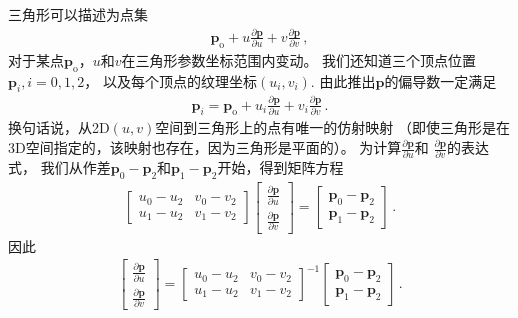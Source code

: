 三角形可以描述为点集
\begin{align*}
    \bm p_{\mathrm{o}}+u\frac{\partial \bm p}{\partial u}+v\frac{\partial \bm p}{\partial v}\, ,
\end{align*}
对于某点$\bm p_{\mathrm{o}}$，$u$和$v$在三角形参数坐标范围内变动。
我们还知道三个顶点位置$\bm p_i, i=0,1,2$，
以及每个顶点的纹理坐标$(u_i,v_i)$.
由此推出$\bm p$的偏导数一定满足
\begin{align*}
    \bm p_i=\bm p_{\mathrm{o}}+u_i\frac{\partial \bm p}{\partial u}+v_i\frac{\partial \bm p}{\partial v}\, .
\end{align*}
换句话说，从2D$(u,v)$空间到三角形上的点有唯一的仿射映射
（即使三角形是在3D空间指定的，该映射也存在，因为三角形是平面的）。
为计算$\displaystyle\frac{\partial \bm p}{\partial u}$和
$\displaystyle\frac{\partial \bm p}{\partial v}$的表达式，
我们从作差$\bm p_0-\bm p_2$和$\bm p_1-\bm p_2$开始，得到矩阵方程
\begin{align*}
    \left[\begin{array}{cc}
            u_0-u_2 & v_0-v_2 \\
            u_1-u_2 & v_1-v_2
        \end{array}\right]\left[\begin{array}{c}
            \displaystyle\frac{\partial \bm p}{\partial u} \\
            \displaystyle\frac{\partial \bm p}{\partial v}
        \end{array}\right]=\left[\begin{array}{c}
            \bm p_0-\bm p_2 \\
            \bm p_1-\bm p_2
        \end{array}\right]\, .
\end{align*}
因此
\begin{align*}
    \left[\begin{array}{c}
            \displaystyle\frac{\partial \bm p}{\partial u} \\
            \displaystyle\frac{\partial \bm p}{\partial v}
        \end{array}\right]=\left[\begin{array}{cc}
            u_0-u_2 & v_0-v_2 \\
            u_1-u_2 & v_1-v_2
        \end{array}\right]^{-1}\left[\begin{array}{c}
            \bm p_0-\bm p_2 \\
            \bm p_1-\bm p_2
        \end{array}\right]\, .
\end{align*}
